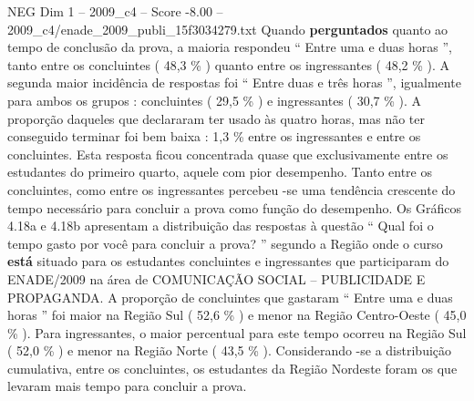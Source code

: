 \begin{textsample}{NEG Dim 1 – 2009\_c4 – Score -8.00 – 2009\_c4/enade\_2009\_publi\_15f3034279.txt}
Quando \textbf{perguntados} quanto ao tempo de conclusão da prova, a maioria respondeu “ Entre uma e duas horas ”, tanto entre os concluintes ( 48,3 \% ) quanto entre os ingressantes ( 48,2 \% ).
A segunda maior incidência de respostas foi “ Entre duas e três horas ”, igualmente para ambos os grupos : concluintes ( 29,5 \% ) e ingressantes ( 30,7 \% ).
A proporção daqueles que declararam ter usado às quatro horas, mas não ter conseguido terminar foi bem baixa : 1,3 \% entre os ingressantes e entre os concluintes.
Esta resposta ficou concentrada quase que exclusivamente entre os estudantes do primeiro quarto, aquele com pior desempenho.
Tanto entre os concluintes, como entre os ingressantes percebeu -se uma tendência crescente do tempo necessário para concluir a prova como função do desempenho.
Os Gráficos 4.18a e 4.18b apresentam a distribuição das respostas à questão “ Qual foi o tempo gasto por você para concluir a prova? ” segundo a Região onde o curso \textbf{está} situado para os estudantes concluintes e ingressantes que participaram do ENADE/2009 na área de COMUNICAÇÃO SOCIAL – PUBLICIDADE E PROPAGANDA.
A proporção de concluintes que gastaram “ Entre uma e duas horas ” foi maior na Região Sul ( 52,6 \% ) e menor na Região Centro-Oeste ( 45,0 \% ).
Para ingressantes, o maior percentual para este tempo ocorreu na Região Sul ( 52,0 \% ) e menor na Região Norte ( 43,5 \% ).
Considerando -se a distribuição cumulativa, entre os concluintes, os estudantes da Região Nordeste foram os que levaram mais tempo para concluir a prova.

\end{textsample}
